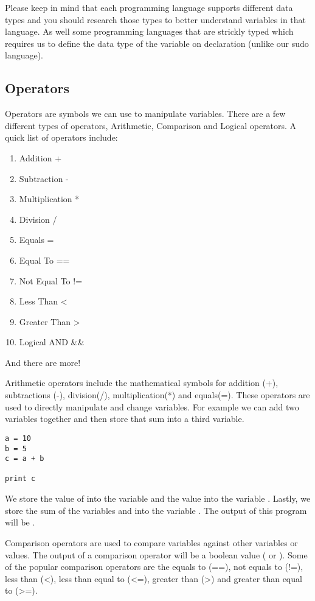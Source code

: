 Please keep in mind that each programming language supports different data types and you should research those types to better
understand variables in that language.
As well some programming languages that are strickly typed which requires us to define the data type of the
variable on declaration (unlike our sudo language).


\subsection{Operators}
Operators are symbols we can use to manipulate variables.
There are a few different types of operators, Arithmetic, Comparison and Logical operators.
A quick list of operators include:

\begin{enumerate}
\item Addition +
\item Subtraction -
\item Multiplication *
\item Division /
\item Equals =
\item Equal To ==
\item Not Equal To !=
\item Less Than <
\item Greater Than > 
\item Logical AND \&\&
\end{enumerate}

And there are more!
\par

Arithmetic operators include the mathematical symbols for addition (+), subtractions (-), division(/), multiplication(*) and equals(=).
These operators are used to directly manipulate and change variables.
For example we can add two variables together and then store that sum into a third variable.

\begin{lstlisting}[caption={Addition Operator}]
a = 10
b = 5
c = a + b

print c
\end{lstlisting}

We store the value of  into the variable  and the value  into the variable .
Lastly, we store the sum of the variables  and  into the variable .
The output of this program will be .
\par

Comparison operators are used to compare variables against other variables or values.
The output of a comparison operator will be a boolean value ( or ).
Some of the popular comparison operators are the equals to (==), not equals to (!=), less than (<), less than equal to (<=), greater than (>) and greater than equal to (>=).

